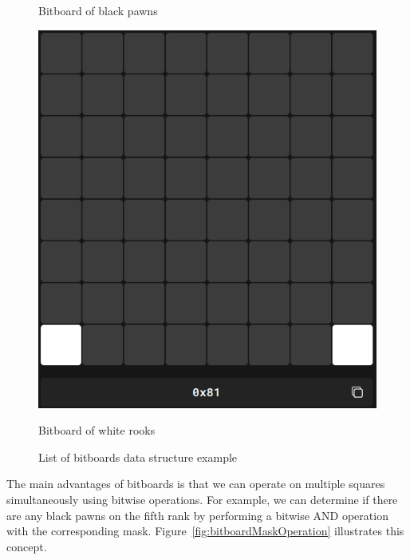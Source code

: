 \begin{figure}[H]
\begin{minipage}[c]{0.30\textwidth}
        \caption*{Bitboard of black pawns}
    \end{minipage}
    \hfill
    \begin{minipage}[c]{0.30\textwidth}
        \includegraphics[width=\textwidth]{Imagenes/bitboard_white_rooks.png}
        \caption*{Bitboard of white rooks}
    \end{minipage}
    \caption{List of bitboards data structure example}
    \label{fig:bitboardPositionExample}
    \vspace{-\baselineskip}
\end{figure}

\newpage

\noindent The main advantages of bitboards is that we can operate on multiple squares simultaneously using bitwise operations. For example, we can determine if there are any black pawns on the fifth rank by performing a bitwise AND operation with the corresponding mask. Figure~\ref{fig:bitboardMaskOperation} illustrates this concept.

